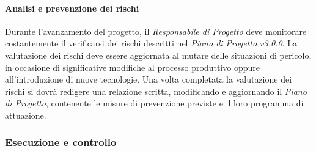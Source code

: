 \paragraph{Analisi e prevenzione dei rischi}
Durante l'avanzamento del progetto, il \textit{Responsabile di Progetto} deve monitorare costantemente il verificarsi dei rischi descritti nel \textit{Piano di Progetto v3.0.0}. La valutazione dei rischi deve essere aggiornata al mutare delle situazioni di pericolo, in occasione di significative modifiche al processo produttivo oppure all'introduzione di nuove tecnologie. Una volta completata la valutazione dei rischi si dovrà redigere una relazione scritta, modificando e aggiornando il \textit{Piano di Progetto}, contenente le misure di prevenzione previste e il loro programma di attuazione.

\newpage
\subsubsection{Esecuzione e controllo}
